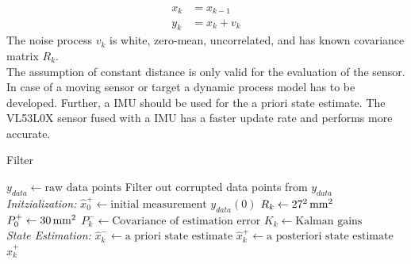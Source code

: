 \begin{equation}
\label{eq:filter}
\begin{split} 
x_k & = x_{k-1} \\
y_k & = x_k + v_k
\end{split}
\end{equation}
The noise process $v_k$ is white, zero-mean, uncorrelated, and has known covariance matrix  $R_k$.\\
The assumption of constant distance is only valid for the evaluation of the sensor. In case of a moving sensor or target a dynamic process model has to be developed. Further, a IMU should be used for the a priori state estimate. The VL53L0X sensor fused with a IMU has a faster update rate and performs more accurate. \\

\begin{algorithm}
	\caption{Filter}\label{alg:filter}
	\begin{algorithmic}[1]
		\State $y_{data}\gets \text{raw data points}$ 
		\State Filter out corrupted data points from $y_{data}$ \\
		\textit{Initzialization:}
		\State $\hat{x}^+_0\gets\text{initial measurement }y_{data}(0)$
		\State $R_k\gets\unit[27^2]{mm^2}$ 
		\State $P^+_0\gets \unit[30]{mm^2}$ 
		\For{ each $k = (0, \text{ number of data point]}$}	
		\State  $P^-_k \gets \text{Covariance of estimation error}$
		\State	$K_k \gets \text{Kalman gains}$
		\EndFor \\
		\textit{State Estimation:}	 
		\For{ each $k = (0, \text{ number of data point]}$}
		\State {} 
		\State $\hat{x}^-_k \gets \text{a priori state estimate}$
		\State $\hat{x}^+_k \gets \text{a posteriori state estimate}$
		\EndFor
		\State \Return $\hat{x}^+_k$
		\EndProcedure
		
	\end{algorithmic}
\end{algorithm}





